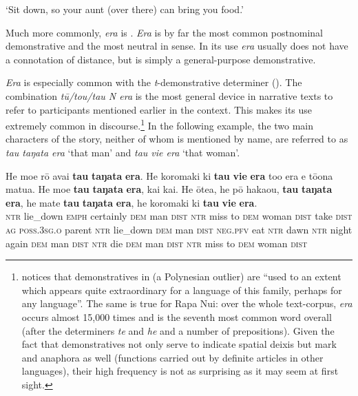 \glt
‘Sit down, so your aunt (over there) can bring you food.’ \textstyleExampleref{[R245.065]} 
\z

Much more commonly, \textit{era} is . \textit{Era} is by far the most common postnominal demonstrative and the most neutral in sense. In its  use \textit{era} usually does not have a connotation of distance, but is simply a general-purpose demonstrative. 

\textit{Era} is especially common with the \textit{t}{}-demonstrative determiner (). The combination \textit{tū}\textit{/tou/tau N era} is the most general device in narrative texts to refer to participants mentioned earlier in the context. This makes its use extremely common in discourse.\footnote{\label{fn:217}\citet[81]{Naess2004} notices that demonstratives in  (a Polynesian outlier) are “used to an extent which appears quite extraordinary for a language of this family, perhaps for any language”. The same is true for Rapa Nui: over the whole text-corpus, \textit{era} occurs almost 15,000 times and is the seventh most common word overall (after the determiners \textit{te} and \textit{he} and a number of prepositions). Given the fact that demonstratives not only serve to indicate spatial deixis but mark  and anaphora as well (functions carried out by definite articles in other languages), their high frequency is not as surprising as it may seem at first sight.} In the following example, the two main characters of the story, neither of whom is mentioned by name, are referred to as \textit{tau taŋata era} ‘that man’ and \textit{tau vi{\ꞌ}e era} ‘that woman’.

\ea\label{ex:4.199}
\gll He moe rō {\ꞌ}avai \textbf{tau} \textbf{taŋata} \textbf{era}. He koromaki ki \textbf{tau} \textbf{vi{\ꞌ}e} \textbf{era}  to{\ꞌ}o era e tō{\ꞌ}ona matu{\ꞌ}a. He moe \textbf{tau} \textbf{taŋata} \textbf{era}, kai kai. He {\ꞌ}ōtea, he pō haka{\ꞌ}ou, \textbf{tau} \textbf{taŋata} \textbf{era}, he mate \textbf{tau} \textbf{taŋata} \textbf{era}, he koromaki ki \textbf{tau} \textbf{vi{\ꞌ}e} \textbf{era}.\\
\textsc{ntr} lie\_down \textsc{emph} certainly \textsc{dem} man \textsc{dist} \textsc{ntr} miss to \textsc{dem} woman \textsc{dist}  take \textsc{dist} \textsc{ag} \textsc{poss.3sg.o} parent \textsc{ntr} lie\_down \textsc{dem} man \textsc{dist} \textsc{neg.pfv} eat \textsc{ntr} dawn \textsc{ntr} night again \textsc{dem} man \textsc{dist} \textsc{ntr} die \textsc{dem} man \textsc{dist} \textsc{ntr} miss to \textsc{dem} woman \textsc{dist}\\

